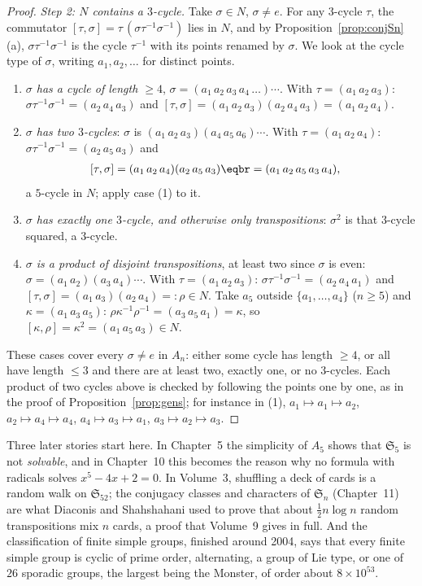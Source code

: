 \begin{proof}
\emph{Step 2: $N$ contains a $3$-cycle.} Take $\sigma\in N$, $\sigma\ne e$. For any $3$-cycle $\tau$, the commutator $[\tau,\sigma]=\tau\,(\sigma\tau^{-1}\sigma^{-1})$ lies in $N$, and by Proposition~\ref{prop:conjSn}(a), $\sigma\tau^{-1}\sigma^{-1}$ is the cycle $\tau^{-1}$ with its points renamed by $\sigma$. We look at the cycle type of $\sigma$, writing $a_1,a_2,\dots$ for distinct points.
\begin{enumerate}[label=(\arabic*)]
\item \emph{$\sigma$ has a cycle of length $\ge4$}, $\sigma=(a_1\,a_2\,a_3\,a_4\,\dots)\cdots$. With $\tau=(a_1\,a_2\,a_3)$: $\sigma\tau^{-1}\sigma^{-1}=(a_2\,a_4\,a_3)$ and $[\tau,\sigma]=(a_1\,a_2\,a_3)(a_2\,a_4\,a_3)=(a_1\,a_2\,a_4)$.
\item \emph{$\sigma$ has two $3$-cycles}: $\sigma$ is $(a_1\,a_2\,a_3)(a_4\,a_5\,a_6)\cdots$. With $\tau=(a_1\,a_2\,a_4)$: $\sigma\tau^{-1}\sigma^{-1}=(a_2\,a_5\,a_3)$ and
\[
\begin{aligned}[\tau,\sigma]&=(a_1\,a_2\,a_4)(a_2\,a_5\,a_3)\eqbr=(a_1\,a_2\,a_5\,a_3\,a_4),\end{aligned}
\]
a $5$-cycle in $N$; apply case (1) to it.
\item \emph{$\sigma$ has exactly one $3$-cycle, and otherwise only transpositions}: $\sigma^2$ is that $3$-cycle squared, a $3$-cycle.
\item \emph{$\sigma$ is a product of disjoint transpositions}, at least two since $\sigma$ is even: $\sigma=(a_1\,a_2)(a_3\,a_4)\cdots$. With $\tau=(a_1\,a_2\,a_3)$: $\sigma\tau^{-1}\sigma^{-1}=(a_2\,a_4\,a_1)$ and $[\tau,\sigma]=(a_1\,a_3)(a_2\,a_4)=:\rho\in N$. Take $a_5$ outside $\{a_1,\dots,a_4\}$ ($n\ge5$) and $\kappa=(a_1\,a_3\,a_5)$: $\rho\kappa^{-1}\rho^{-1}=(a_3\,a_5\,a_1)=\kappa$, so $[\kappa,\rho]=\kappa^2=(a_1\,a_5\,a_3)\in N$.
\end{enumerate}
These cases cover every $\sigma\ne e$ in $A_n$: either some cycle has length $\ge4$, or all have length $\le3$ and there are at least two, exactly one, or no $3$-cycles. Each product of two cycles above is checked by following the points one by one, as in the proof of Proposition~\ref{prop:gens}; for instance in (1), $a_1\mapsto a_1\mapsto a_2$, $a_2\mapsto a_4\mapsto a_4$, $a_4\mapsto a_3\mapsto a_1$, $a_3\mapsto a_2\mapsto a_3$.
\end{proof}

\begin{beauty}
Three later stories start here. In Chapter~5 the simplicity of $A_5$ shows that $\mathfrak S_5$ is not \emph{solvable}, and in Chapter~10 this becomes the reason why no formula with radicals solves $x^5-4x+2=0$. In Volume~3, shuffling a deck of cards is a random walk on $\mathfrak S_{52}$; the conjugacy classes and characters of $\mathfrak S_n$ (Chapter~11) are what Diaconis and Shahshahani used to prove that about $\frac12n\log n$ random transpositions mix $n$ cards, a proof that Volume~9 gives in full. And the classification of finite simple groups, finished around 2004, says that every finite simple group is cyclic of prime order, alternating, a group of Lie type, or one of $26$ sporadic groups, the largest being the Monster, of order about $8\times10^{53}$.
\end{beauty}

